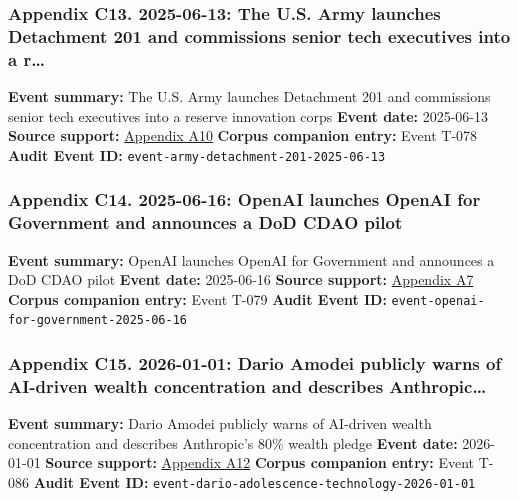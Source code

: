 \documentclass[
  american,
  11pt,
  letterpaper,
]{article}
\begin{document}
\subsubsection{Appendix C13. 2025-06-13: The U.S. Army launches
Detachment 201 and commissions senior tech executives into a
r\ldots{}}\label{appendix-c13-2025-06-13-the-u-s-army-launches-detachment-201-and-commissions-senior-tech-executives-into-a-reserve-innovation-corps}

\textbf{Event summary:} The U.S. Army launches Detachment 201 and
commissions senior tech executives into a reserve innovation corps
\textbf{Event date:} 2025-06-13 \textbf{Source support:}
\hyperref[appendix-a10-army-launches-detachment-201-executive-innovation-corps-to-drive-tech-transformation]{Appendix
A10} \textbf{Corpus companion entry:} Event T-078 \textbf{Audit Event
ID:} \texttt{event-army-detachment-201-2025-06-13}

\subsubsection{Appendix C14. 2025-06-16: OpenAI launches OpenAI for
Government and announces a DoD CDAO
pilot}\label{appendix-c14-2025-06-16-openai-launches-openai-for-government-and-announces-a-dod-cdao-pilot}

\textbf{Event summary:} OpenAI launches OpenAI for Government and
announces a DoD CDAO pilot \textbf{Event date:} 2025-06-16
\textbf{Source support:}
\hyperref[appendix-a7-introducing-openai-for-government]{Appendix A7}
\textbf{Corpus companion entry:} Event T-079 \textbf{Audit Event ID:}
\texttt{event-openai-for-government-2025-06-16}

\subsubsection{Appendix C15. 2026-01-01: Dario Amodei publicly warns of
AI-driven wealth concentration and describes
Anthropic\ldots{}}\label{appendix-c15-2026-01-01-dario-amodei-publicly-warns-of-ai-driven-wealth-concentration-and-describes-anthropic-s-80-wealth-pledge}

\textbf{Event summary:} Dario Amodei publicly warns of AI-driven wealth
concentration and describes Anthropic's 80\% wealth pledge \textbf{Event
date:} 2026-01-01 \textbf{Source support:}
\hyperref[appendix-a12-the-adolescence-of-technology]{Appendix A12}
\textbf{Corpus companion entry:} Event T-086 \textbf{Audit Event ID:}
\texttt{event-dario-adolescence-technology-2026-01-01}
\end{document}
